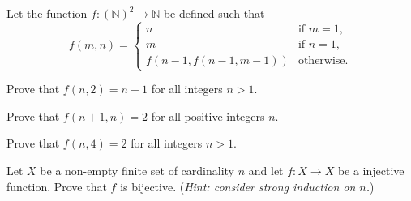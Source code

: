 \begin{problem}
    Let the function $f: \left(\mathbb{N}\right)^2\to\mathbb{N}$ be defined such that
    \[
        f(m, n) =
        \begin{cases}
            n & \text{if } m = 1, \\
            m & \text{if } n = 1, \\
            f\left(n-1,f(n-1,m-1)\right) & \text{otherwise.}
        \end{cases}
    \]
    \begin{partquestions}{\roman*}
        \item Prove that $f(n,2) = n - 1$ for all integers $n > 1$.
        \item Prove that $f(n+1, n) = 2$ for all positive integers $n$.
        \item Prove that $f(n, 4) = 2$ for all integers $n > 1$.
    \end{partquestions}
\end{problem}

\begin{problem}\label{problem-injection-from-finite-set-to-itself-is-bijection}
    Let $X$ be a non-empty finite set of cardinality $n$ and let $f: X \to X$ be a injective function. Prove that $f$ is bijective.\newline
    (\textit{Hint: consider strong induction on $n$.})
\end{problem}
